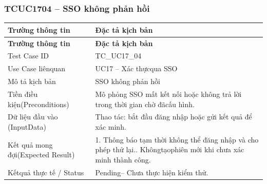 \subsubsection{TCUC1704 – SSO không phản hồi}
\begin{longtable}{|L{0.24\textwidth}|L{0.70\textwidth}|}
\hline
\textbf{Trường thông tin} & \textbf{Đặc tả kịch bản} \\
\hline
\endfirsthead
\hline
\textbf{Trường thông tin} & \textbf{Đặc tả kịch bản} \\
\hline
\endhead
Test Case ID & TC\_UC17\_04 \\
\hline
Use Case liênquan & UC17 – Xác thựcqua SSO \\
\hline
Mô tả kịch bản & SSO không phản hồi \\
\hline
Tiền điều kiện\newline (Preconditions) & Mô phỏng SSO mất kết nối hoặc không trả lời trong thời gian chờ đã\newline cấu hình. \\
\hline
Dữ liệu đầu vào (Input\newline Data) & Thao tác: bắt đầu đăng nhập hoặc gửi kết quả để xác minh. \\
\hline
Kết quả mong đợi\newline (Expected Result) & 1. Thông báo tạm thời không thể đăng nhập và cho phép thử lại.. Khôngtạophiên mới khi chưa xác minh thành công. \\
\hline
Kếtquả thực tế / Status & Pending– Chưa thực hiện kiểm thử. \\
\hline
\end{longtable}
\vspace{-0.5\baselineskip}
\normalsize